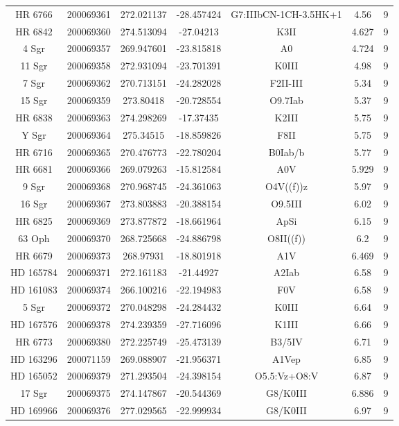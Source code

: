 \begin{table*}
\begin{tabular}{ccccccc}
HR 6766 & 200069361 & 272.021137 & -28.457424 & G7:IIIbCN-1CH-3.5HK+1 & 4.56 & 9 \\
HR 6842 & 200069360 & 274.513094 & -27.04213 & K3II & 4.627 & 9 \\
4 Sgr & 200069357 & 269.947601 & -23.815818 & A0 & 4.724 & 9 \\
11 Sgr & 200069358 & 272.931094 & -23.701391 & K0III & 4.98 & 9 \\
7 Sgr & 200069362 & 270.713151 & -24.282028 & F2II-III & 5.34 & 9 \\
15 Sgr & 200069359 & 273.80418 & -20.728554 & O9.7Iab & 5.37 & 9 \\
HR 6838 & 200069363 & 274.298269 & -17.37435 & K2III & 5.75 & 9 \\
Y Sgr & 200069364 & 275.34515 & -18.859826 & F8II & 5.75 & 9 \\
HR 6716 & 200069365 & 270.476773 & -22.780204 & B0Iab/b & 5.77 & 9 \\
HR 6681 & 200069366 & 269.079263 & -15.812584 & A0V & 5.929 & 9 \\
9 Sgr & 200069368 & 270.968745 & -24.361063 & O4V((f))z & 5.97 & 9 \\
16 Sgr & 200069367 & 273.803883 & -20.388154 & O9.5III & 6.02 & 9 \\
HR 6825 & 200069369 & 273.877872 & -18.661964 & ApSi & 6.15 & 9 \\
63 Oph & 200069370 & 268.725668 & -24.886798 & O8II((f)) & 6.2 & 9 \\
HR 6679 & 200069373 & 268.97931 & -18.801918 & A1V & 6.469 & 9 \\
HD 165784 & 200069371 & 272.161183 & -21.44927 & A2Iab & 6.58 & 9 \\
HD 161083 & 200069374 & 266.100216 & -22.194983 & F0V & 6.58 & 9 \\
5 Sgr & 200069372 & 270.048298 & -24.284432 & K0III & 6.64 & 9 \\
HD 167576 & 200069378 & 274.239359 & -27.716096 & K1III & 6.66 & 9 \\
HR 6773 & 200069380 & 272.225749 & -25.473139 & B3/5IV & 6.71 & 9 \\
HD 163296 & 200071159 & 269.088907 & -21.956371 & A1Vep & 6.85 & 9 \\
HD 165052 & 200069379 & 271.293504 & -24.398154 & O5.5:Vz+O8:V & 6.87 & 9 \\
17 Sgr & 200069375 & 274.147867 & -20.544369 & G8/K0III & 6.886 & 9 \\
HD 169966 & 200069376 & 277.029565 & -22.999934 & G8/K0III & 6.97 & 9 \\

\end{tabular}
\end{table*}
